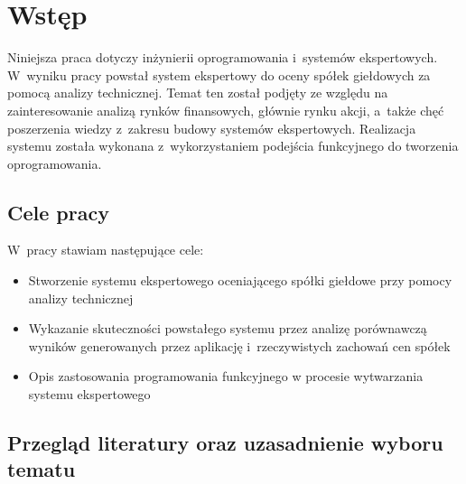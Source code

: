 \chapter{Wstęp}
Niniejsza praca dotyczy inżynierii oprogramowania i~systemów ekspertowych. W~wyniku pracy powstał system ekspertowy do oceny spółek giełdowych za pomocą analizy technicznej. Temat ten został podjęty ze względu na zainteresowanie analizą rynków finansowych, głównie rynku akcji, a~także chęć poszerzenia wiedzy z~zakresu budowy systemów ekspertowych. Realizacja systemu została wykonana z~wykorzystaniem podejścia funkcyjnego do tworzenia oprogramowania.

\section{Cele pracy}\label{sec:cele_pracy}

W~pracy stawiam następujące cele:

\begin{itemize}
 \item Stworzenie systemu ekspertowego oceniającego spółki giełdowe przy pomocy analizy technicznej
 \item Wykazanie skuteczności powstałego systemu przez analizę porównawczą wyników generowanych przez aplikację i~rzeczywistych zachowań cen spółek
 \item Opis zastosowania programowania funkcyjnego w procesie wytwarzania systemu ekspertowego
\end{itemize}

\section{Przegląd literatury oraz uzasadnienie wyboru tematu}

